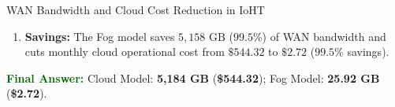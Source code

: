 \documentclass[11pt,a4paper,openany]{report}
\newcommand{\Answer}{\par\textbf{\textcolor{darkgreen}{Final Answer:}} }
\begin{document}
\begin{solved}{WAN Bandwidth and Cloud Cost Reduction in IoHT}
\begin{enumerate}[leftmargin=*]
  Only $0.5\%$ ($0.005$) of data reaches Cloud:
  \begin{equation}
  V_{\text{fog}} = 5,184\text{ GB} \times 0.005 = 25.92\text{ GB}
  \end{equation}
  \textbf{Bandwidth Cost:} $25.92\text{ GB} \times \$0.08/\text{GB} = \$2.07$.
  \textbf{Compute Cost:} $\$129.60 \times 0.005 = \$0.65$.
  \begin{equation}
  \text{Total Fog Cost} = \$2.07 + \$0.65 = \$2.72/\text{month}
  \end{equation}
  \item \textbf{Savings:} The Fog model saves $5,158\text{ GB}$ ($99.5\%$) of WAN bandwidth and cuts monthly cloud operational cost from $\$544.32$ to $\$2.72$ ($99.5\%$ savings).
\end{enumerate}
\Answer Cloud Model: \textbf{5,184 GB} (\textbf{\$544.32}); Fog Model: \textbf{25.92 GB} (\textbf{\$2.72}).
\end{solved}
\end{document}
